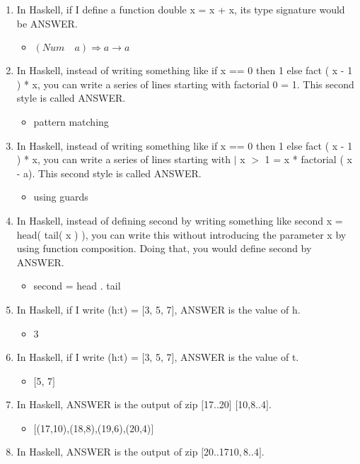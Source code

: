 \documentclass{exam}
\begin{document}
\begin{enumerate}
\item In Haskell, if I define a function double x = x + x, its type signature would be ANSWER.
\begin{itemize}
\item $(Num \quad a) \Rightarrow a \rightarrow a$
\end{itemize}
\item In Haskell, instead of writing something like if x == 0 then 1 else fact ( x - 1 ) * x, you can write a series of lines starting with factorial 0 = 1.  This second style is called ANSWER.
\begin{itemize}
\item pattern matching
\end{itemize}
\item In Haskell, instead of writing something like if x == 0 then 1 else fact ( x - 1 ) * x, you can write a series of lines starting with $|$ x $>$ 1 = x * factorial ( x - a).  This second style is called ANSWER.
\begin{itemize}
\item using guards
\end{itemize}
\item In Haskell, instead of defining second by writing something like second x = head( tail(  x ) ), you can write this without introducing the parameter x by using function composition.  Doing that, you would define second by ANSWER.
\begin{itemize}
\item second = head . tail
\end{itemize}
\item In Haskell, if I write (h:t) = $\lbrack$3, 5, 7$\rbrack$, ANSWER is the value of h.
\begin{itemize}
\item 3
\end{itemize}
\item In Haskell, if I write (h:t) = $\lbrack$3, 5, 7$\rbrack$, ANSWER is the value of t.
\begin{itemize}
\item $\lbrack$5, 7$\rbrack$
\end{itemize}
\item In Haskell, ANSWER is the output of zip $\lbrack$17..20$\rbrack$ $\lbrack$10,8..4$\rbrack$.
\begin{itemize}
\item $\lbrack$(17,10),(18,8),(19,6),(20,4)$\rbrack$
\end{itemize}
\item In Haskell, ANSWER is the output of zip $\lbrack$20..17\rbrack$ $\lbrack$10,8..4\rbrack$.

\end{enumerate}
\end{document}
